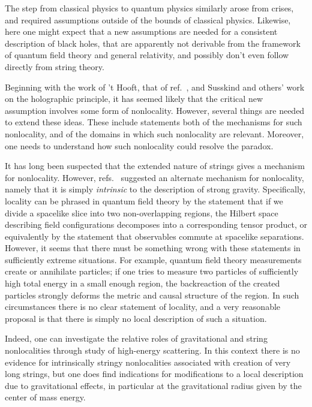 
The step from classical physics to quantum physics similarly arose from crises, and required assumptions outside of the bounds of classical physics.  Likewise, here one might expect that a new assumptions are needed for a consistent description of black holes, that are apparently not derivable from the framework of quantum field theory and general relativity, and possibly don't even follow directly from string theory.

Beginning with the work of 't Hooft, that of ref.~\BHMR, and  Susskind and others' work on the holographic principle, it has seemed likely that the critical new assumption involves some form of nonlocality.  However, several things are needed to extend these ideas.  These include statements both of the mechanisms for such nonlocality, and of the domains in which such nonlocality are relevant.  Moreover, one needs to understand how such nonlocality could resolve the paradox.

It has long been suspected that the extended nature of strings gives a mechanism for nonlocality.  However, refs.~ suggested an alternate mechanism for nonlocality, namely that it is simply {\it intrinsic} to the description of strong gravity.  Specifically, locality can be phrased in quantum field theory by the statement that if we divide a spacelike slice into two non-overlapping regions, the Hilbert space describing field configurations decomposes into a corresponding tensor product, or equivalently by the statement that observables commute at spacelike separations.  However, it seems that there must be something wrong with these statements in sufficiently extreme situations.  For example, quantum field theory measurements create or annihilate particles; if one tries to measure two particles of sufficiently high total energy in a small enough region, the backreaction of the created particles strongly deforms the metric and causal structure of the region.  In such circumstances there is no clear statement of locality, and a very reasonable proposal is that there is simply no local description of such a situation.  

Indeed, one can investigate the relative roles of gravitational and string nonlocalities through study of high-energy scattering.  In this context there is no evidence for intrinsically stringy nonlocalities associated with creation of very long strings, but one does find indications for modifications to a local description due to gravitational effects,  in particular at the gravitational radius given by the center of mass energy.


